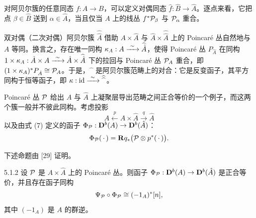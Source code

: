 
对阿贝尔簇的任意同态 $f:A\to B$，可以定义对偶同态 $\hat f:\hat B\to\hat A$。逐点来看，它把点 $\beta\in\hat B$ 送到 $\alpha\in\hat A$，当且仅当 $A$ 上的线丛 $f^*\mathcal{P}_\beta$ 与 $\mathcal{P}_\alpha$ 重合。

双对偶（二次对偶）阿贝尔簇 $\widehat{\hat A}$ 借助 $A\times\hat A$ 与 $\hat A\times\widehat{\hat A}$ 上的 Poincaré 丛自然地与 $A$ 等同。换言之，存在唯一同构 $\kappa_A:A\xrightarrow{\ \sim\ }\widehat{\hat A}$，使得 Poincaré 丛 $P_{\hat A}$ 在同构 $1\times\kappa_A:\hat A\times A\xrightarrow{\ \sim\ }\hat A\times\widehat{\hat A}$ 下的拉回与 Poincaré 丛 $\mathcal{P}_A$ 重合，即 $(1\times\kappa_A)^*P_{\hat A}\cong\mathcal{P}_A$。于是，$\widehat{\phantom{x}}$ 是阿贝尔簇范畴上的对合：它是反变函子，其平方同构于恒等函子，即 $\kappa:\mathrm{id}\xrightarrow{\ \sim\ }\widehat{\widehat{\phantom{x}}}$。


Poincaré 丛 $\mathcal{P}$ 给出 $A$ 与 $\hat A$ 上凝聚层导出范畴之间正合等价的一个例子，而这两个簇一般并不彼此同构。考虑投影
\begin{equation*}
A\xleftarrow{\ p\ }A\times\hat A\xrightarrow{\ q\ }\hat A
\end{equation*}
以及由式 (7) 定义的函子 $\Phi_{\mathcal{P}}:\mathbf{D}^{b}(A)\to\mathbf{D}^{b}(\hat A)$：
\begin{equation*}
\Phi_{\mathcal{P}}(\,\cdot\,)=\mathbf{R} q_*\bigl(\mathcal{P}\otimes p^*(\,\cdot\,)\bigr).
\end{equation*}


下述命题由 [29] 证明。

\begin{proposition}[29]{5.1.2}
设 $\mathcal{P}$ 是 $A\times\hat A$ 上的 Poincaré 丛。则函子 $\Phi_{\mathcal{P}}:\mathbf{D}^{b}(A)\to\mathbf{D}^{b}(\hat A)$ 是正合等价，并且存在函子同构
\begin{equation*}
\Psi_{\mathcal{P}}\circ\Phi_{\mathcal{P}}\cong(-1_A)^*[n],
\end{equation*}
其中 $(-1_A)$ 是 $A$ 的群逆。
\end{proposition}

